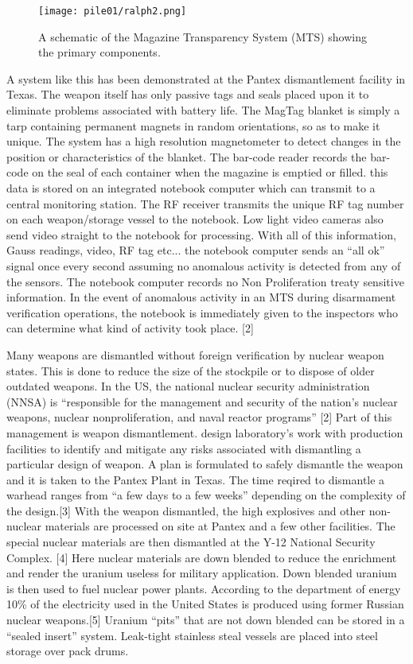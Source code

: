 \documentclass[twocolumn,a4paper]{article}
\begin{document}
\begin{figure}
  \texttt{[image: pile01/ralph2.png]}
  \caption{A schematic of the Magazine Transparency System (MTS) showing the primary components.}
\end{figure}

A system like this has been demonstrated at the Pantex dismantlement facility in 
Texas. The weapon itself has only passive tags and seals placed upon it to eliminate 
problems associated with battery life. The MagTag blanket is simply a tarp containing 
permanent magnets in random orientations, so as to make it unique. The system has a 
high resolution magnetometer to detect changes in the position or characteristics of 
the blanket. The bar-code reader records the bar-code on the seal of each container 
when the magazine is emptied or filled. this data is stored on an integrated notebook 
computer which can transmit to a central monitoring station. The RF receiver transmits 
the unique RF tag number on each weapon/storage vessel to the notebook. Low light video 
cameras also send video straight to the notebook for processing. With all of this 
information, Gauss readings, video, RF tag etc... the notebook computer sends an ``all 
ok'' signal once every second assuming no anomalous activity is detected from any of the 
sensors. The notebook computer records no Non Proliferation treaty sensitive information. 
In the event of anomalous activity in an MTS during disarmament verification operations, 
the notebook is immediately given to the inspectors who can determine what kind of 
activity took place. [2]

Many weapons are dismantled without foreign verification by nuclear weapon states. 
This is done to reduce the size of the stockpile or to dispose of older outdated weapons. 
In the US, the national nuclear security administration (NNSA) is ``responsible for the 
management and security of the nation's nuclear weapons, nuclear nonproliferation, and 
naval reactor programs'' [2] Part of this management is weapon dismantlement. design 
laboratory's work with production facilities to identify and mitigate any risks 
associated with dismantling a particular design of weapon. A plan is formulated to 
safely dismantle the weapon and it is taken to the Pantex Plant in Texas. The time 
reqired to dismantle a warhead ranges from ``a few days to a few weeks'' depending on 
the complexity of the design.[3] With the weapon dismantled, the high explosives and 
other non-nuclear materials are processed on site at Pantex and a few other facilities. 
The special nuclear materials are then dismantled at the Y-12 National Security Complex. 
[4] Here nuclear materials are down blended to reduce the enrichment and render the 
uranium useless for military application. Down blended uranium is then used to fuel 
nuclear power plants. According to the department of energy 10\% of the electricity 
used in the United States is produced using former Russian nuclear weapons.[5] Uranium 
``pits'' that are not down blended can be stored in a ``sealed insert'' system. Leak-tight 
stainless steal vessels are placed into steel storage over pack drums.
\end{document}

